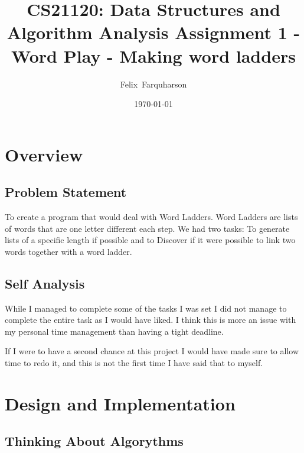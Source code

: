 \documentclass[final,a4paper,twoside,12pt]{report}
\title{CS21120: Data Structures and Algorithm Analysis
Assignment 1 - Word Play - Making word ladders}
\date{\today}
\author{Felix~Farquharson}
\begin{document}
\maketitle
\tableofcontents

\section{Overview}
\subsection{Problem Statement}
To create a program that would deal with Word Ladders. Word Ladders are lists 
of words that are one letter different each step. We had two tasks: To generate
lists of a specific length if possible and to Discover if it were possible to 
link two words together with a word ladder.

\subsection{Self Analysis}
While I managed to complete some of the tasks I was set I did not manage to 
complete the entire task as I would have liked. I think this is more an issue
with my personal time management than having a tight deadline.

If I were to have a second chance at this project I would have made sure to
allow time to redo it, and this is not the first time I have said that to 
myself.

\section{Design and Implementation}

\subsection{Thinking About Algorythms}
\end{document}
